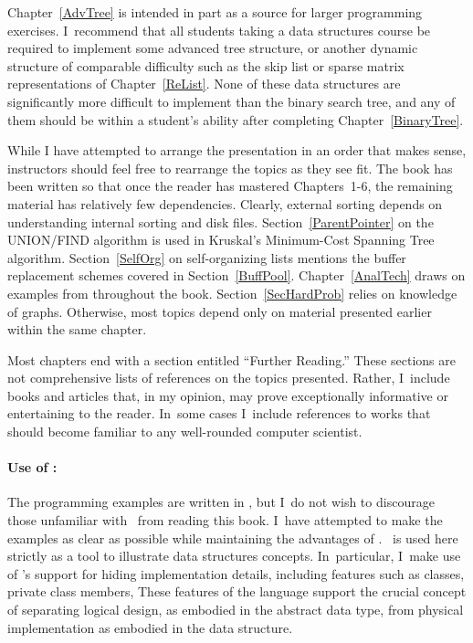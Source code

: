Chapter~\ref{AdvTree} is intended in part as a source for
larger programming exercises.
I~recommend that all students taking a data structures course be
required to implement some advanced tree structure, or another dynamic
structure of comparable difficulty such as the
skip list or
sparse matrix representations of
Chapter~\ref{ReList}.
None of these data structures are significantly more difficult to
implement than the binary search tree, and any of them
should be within a student's ability after completing
Chapter~\ref{BinaryTree}.

While I have attempted to arrange the presentation in an order that
makes sense, instructors should feel free to rearrange the
topics as they see fit.
The book has been written so that once the reader has mastered
Chapters~1-6, the remaining material has relatively few dependencies.
Clearly, external sorting depends on
understanding internal sorting and disk files.
Section~\ref{ParentPointer} on the UNION/FIND
algorithm
is used in Kruskal's Minimum-Cost Spanning Tree
algorithm.
Section~\ref{SelfOrg} on
self-organizing lists mentions the
buffer replacement schemes covered in
Section~\ref{BuffPool}.
Chapter~\ref{AnalTech} draws on examples from throughout the book.
Section~\ref{SecHardProb} relies on knowledge of graphs.
Otherwise, most topics depend only on material presented earlier
within the same chapter.

Most chapters end with a section entitled ``Further Reading.''
These sections are not comprehensive lists of
references on the topics presented.
Rather, I~include books and articles that, in my opinion,
may prove exceptionally informative or entertaining to the reader.
In~some cases I~include references to works that should become
familiar to any well-rounded computer scientist.

\paragraph{Use of \Langsf:}
The programming examples are written in \Lang, but
I~do not wish to discourage those unfamiliar with \Lang\ from reading
this book.
I~have attempted to make the examples as clear as possible while
maintaining the advantages of \Lang.
\Lang\ is used here strictly as a tool to illustrate data structures
concepts.
In~particular, I~make use of \Lang's support for
hiding implementation details, including features such as classes,
private class members,
These features of the language support the crucial concept of
separating logical design, as embodied in the abstract data type, from
physical implementation as embodied in the
data structure.

